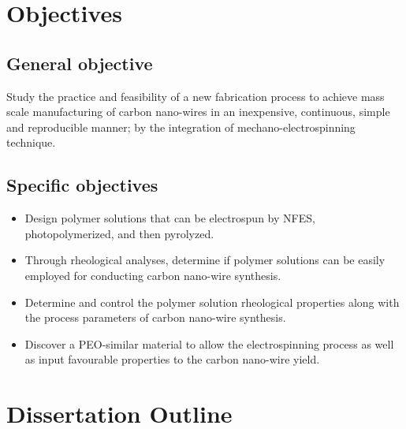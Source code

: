 \section{Objectives}

\subsection{General objective}
Study the practice and feasibility of a new fabrication process to achieve mass scale manufacturing of carbon nano-wires in an inexpensive, continuous, simple and reproducible manner; by the integration of mechano-electrospinning technique.

\subsection{Specific objectives}

\begin{itemize}
	\item{
	Design polymer solutions that can be electrospun by NFES, photopolymerized, and then pyrolyzed.
    }
    \item{
    Through rheological analyses, determine if polymer solutions can be easily employed for conducting carbon nano-wire synthesis.
    }
    \item{
    Determine and control the polymer solution rheological properties along with the process parameters of carbon nano-wire synthesis.
    }
    \item{
    Discover a PEO-similar material to allow the electrospinning process as well as input favourable properties to the carbon nano-wire yield.
    }
\end{itemize}

\section{Dissertation Outline}


